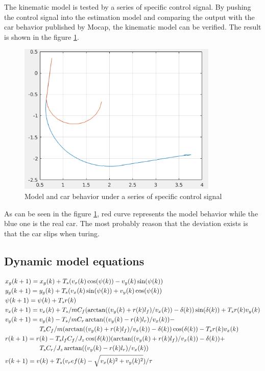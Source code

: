 The kinematic model is tested by a series of specific control signal. By pushing the control signal into the estimation model and comparing the output with the car behavior published by Mocap, the kinematic model can be verified. The result is shown in the figure \ref{fig:mesh1}.

\begin{figure}[h]
    \centering
    \includegraphics[width=0.85\textwidth]{./figures/kmver}
    \caption{Model and car behavior under a series of specific control signal}
    \label{fig:mesh1}
\end{figure}

As can be seen in the figure \ref{fig:mesh1}, red curve represents the model behavior while the blue one is the real car. The most probably reason that the deviation exists is that the car slips when turing.


\subsection{Dynamic model equations}

\begin{align*}
    & x_g(k+1) = x_g(k) + T_s (v_x(k) \cos(\psi(k)) - v_y(k) \sin(\psi(k)) \\
    & y_g(k+1) = y_g(k) + T_s (v_x(k) \sin(\psi(k)) + v_y(k) \cos(\psi(k)) \\
    & \psi(k+1) = \psi(k) + T_s r(k)\\
    & v_x(k+1) = v_x(k) + T_s / m C_f (\arctan((v_y(k)+r(k) l_f)/v_x(k)) - \delta(k)) \sin(\delta(k)) + T_s r(k) v_y(k)\\
    & v_y(k+1) = v_y(k) - T_s / m C_r \arctan((v_y(k)-r(k) l_r)/v_x(k)) - \\
    & \hspace{19mm}T_s C_f / m (\arctan((v_y(k)+r(k) l_f)/v_x(k))-\delta(k)) \cos(\delta(k)) - T_s r(k) v_x(k)\\
    & r(k+1) = r(k) - T_s l_f C_f/J_z \cos(\delta(k)) (\arctan((v_y(k)+r(k) l_f)/v_x(k))-\delta(k)) +\\
    & \hspace{19mm}T_s C_r / J_z \arctan((v_y(k)-r(k) l_r)/v_x(k))\\
    & v(k+1) = v(k) + T_s (v_ref(k) - \sqrt{v_x(k)^2 + v_y(k)^2})/\tau
\end{align*}

